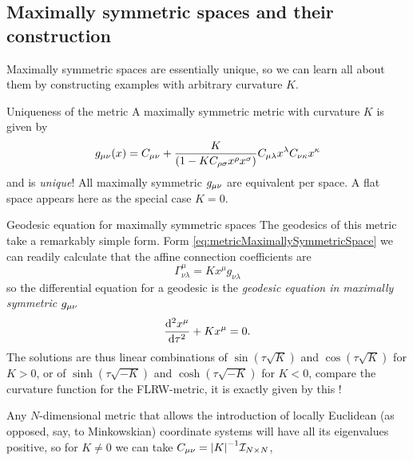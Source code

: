 \subsection{Maximally symmetric spaces and their construction}
Maximally symmetric spaces are essentially unique, so we can learn all about them by constructing examples with arbitrary curvature $K$.
\begin{mybox}{Uniqueness of the metric}
	A maximally symmetric metric with curvature $K$ is given by
	\begin{equation}
	\label{eq:metricMaximallySymmetricSpace}
		g_{\mu \nu}(x) = C_{\mu \nu} + \frac{K}{(1-K C_{\rho \sigma} x^\rho x^\sigma)} C_{\mu \lambda} x^\lambda C_{\nu \kappa} x^\kappa
	\end{equation}
	and is \emph{unique}! All maximally symmetric $g_{\mu \nu}$ are equivalent per space. A flat space appears here as the special case $K=0$. 
\end{mybox}
\begin{mybox}{Geodesic equation for maximally symmetric spaces}
The geodesics of this metric take a remarkably simple form. Form \ref{eq:metricMaximallySymmetricSpace} we can readily calculate that the affine connection coefficients are
\begin{equation}
	\Gamma^\mu_{\nu \lambda} = K x^\mu g_{\nu \lambda}
\end{equation}
so the differential equation for a geodesic is the \emph{geodesic equation in maximally symmetric $g_{\mu \nu}$}
\begin{equation}
\label{eq:geodesiceqMaximallySymmetricSpace}
\frac{\mathrm{d}^2 x^\mu}{\mathrm{d} \tau^2} + K x^\mu = 0.
\end{equation}
The solutions are thus linear combinations of $\sin(\tau \sqrt{K})$ and $\cos(\tau \sqrt{K})$ for $K>0$, or of $\sinh(\tau \sqrt{-K})$ and $\cosh(\tau \sqrt{-K})$ for $K<0$, compare the curvature function for the FLRW-metric, it is exactly given by this !
\end{mybox}
Any $N$-dimensional metric that allows the introduction of locally Euclidean (as opposed, say, to Minkowskian) coordinate systems will have all its eigenvalues positive, so for $K\neq0$ we can take $C_{\mu \nu}=\abs{K}^{-1}\mathcal{I}_{N\times N}$, 

